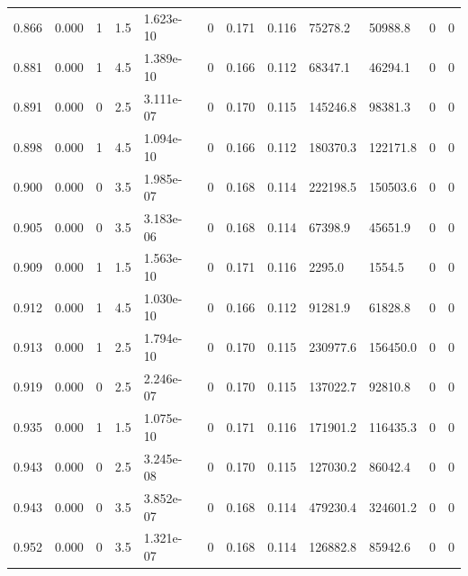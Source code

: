 \documentclass[preview]{standalone}
\begin{document}
{{{\begin{tabular}{L{1.2cm}C{1.2cm} C{0.3cm}C{0.5cm} C{1.4cm}C{1.4cm} C{1.4cm}C{1.4cm} C{1.6cm}C{1.6cm} C{1.6cm}C{1.6cm}}
  0.866  &  0.000  & 1     & 1.5 &  1.623e-10  & 0  &  0.171&   0.116& 75278.2 & 50988.8   &  0 & 0  \\ 
  0.881  &  0.000  & 1     & 4.5 &  1.389e-10  & 0  &  0.166&   0.112& 68347.1 & 46294.1   &  0 & 0  \\ 
  0.891  &  0.000  & 0     & 2.5 &  3.111e-07  & 0  &  0.170&   0.115& 145246.8 & 98381.3   &  0 & 0  \\ 
  0.898  &  0.000  & 1     & 4.5 &  1.094e-10  & 0  &  0.166&   0.112& 180370.3 & 122171.8   &  0 & 0  \\ 
  0.900  &  0.000  & 0     & 3.5 &  1.985e-07  & 0  &  0.168&   0.114& 222198.5 & 150503.6   &  0 & 0  \\ 
  0.905  &  0.000  & 0     & 3.5 &  3.183e-06  & 0  &  0.168&   0.114& 67398.9 & 45651.9   &  0 & 0  \\ 
  0.909  &  0.000  & 1     & 1.5 &  1.563e-10  & 0  &  0.171&   0.116& 2295.0 & 1554.5   &  0 & 0  \\ 
  0.912  &  0.000  & 1     & 4.5 &  1.030e-10  & 0  &  0.166&   0.112& 91281.9 & 61828.8   &  0 & 0  \\ 
  0.913  &  0.000  & 1     & 2.5 &  1.794e-10  & 0  &  0.170&   0.115& 230977.6 & 156450.0   &  0 & 0  \\ 
  0.919  &  0.000  & 0     & 2.5 &  2.246e-07  & 0  &  0.170&   0.115& 137022.7 & 92810.8   &  0 & 0  \\ 
  0.935  &  0.000  & 1     & 1.5 &  1.075e-10  & 0  &  0.171&   0.116& 171901.2 & 116435.3   &  0 & 0  \\ 
  0.943  &  0.000  & 0     & 2.5 &  3.245e-08  & 0  &  0.170&   0.115& 127030.2 & 86042.4   &  0 & 0  \\ 
  0.943  &  0.000  & 0     & 3.5 &  3.852e-07  & 0  &  0.168&   0.114& 479230.4 & 324601.2   &  0 & 0  \\ 
  0.952  &  0.000  & 0     & 3.5 &  1.321e-07  & 0  &  0.168&   0.114& 126882.8 & 85942.6   &  0 & 0  \\ 
\hline 
\end{tabular} 

}}}
\end{document}
